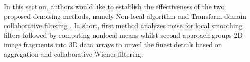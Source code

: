 %




In this section, authors would like to establish the effectiveness of the two proposed denoising methods, namely Non-local algorithm \cite{Buades} and Transform-domain collaborative filtering \cite{dabov2007image}. In short, first method analyzes noise for  local smoothing filters followed by computing nonlocal means whilst second approach groups 2D image fragments into 3D data arrays to unveil the finest details based on aggregation and collaborative Wiener filtering.  

